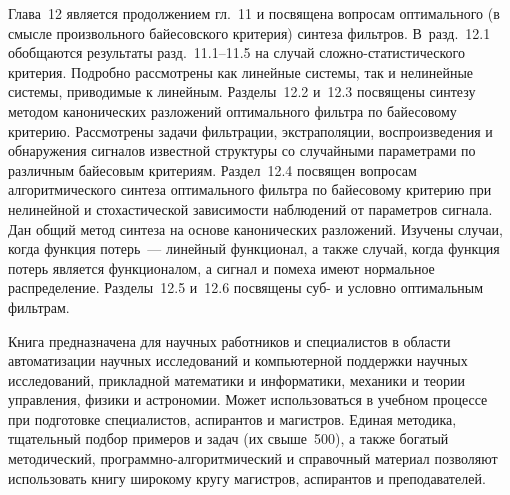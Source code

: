 \begin{multicols}{2}
{{\def\leftkol{РЕЦЕНЗИИ}

\def\rightkol{РЕЦЕНЗИИ} 

      Глава~12 является продолжением гл.~11 и посвящена вопросам оптимального (в 
смысле произвольного байесовского критерия) синтеза фильтров. В~разд.~12.1 
обобщаются результаты разд.~11.1--11.5 на случай сложно-ста\-ти\-сти\-че\-ско\-го критерия. 
Подробно рас\-смот\-ре\-ны как линейные системы, так и нелинейные системы, приводимые к 
линейным. Разделы~12.2 и~12.3 посвящены синтезу методом канонических разложений 
оптимального фильтра по байесовому критерию. Рассмотрены задачи фильтрации, 
экстраполяции, воспроизведения и обнаружения сигналов известной структуры со 
случайными параметрами по различным байесовым критериям. Раздел~12.4 посвящен 
вопросам алгоритмического синтеза оптимального фильтра по байесовому критерию при 
нелинейной и стохастической зависимости наблюдений от параметров сигнала. Дан 
общий метод синтеза на основе канонических разложений. Изучены случаи, когда 
функция потерь~--- линейный функционал, а также случай, когда функция потерь 
является функционалом, а сигнал и помеха имеют нормальное распределение. 
Разделы~12.5 и~12.6 посвящены суб- и условно оптимальным фильтрам.  
      
      
      \def\leftkol{РЕЦЕНЗИИ}

\def\rightkol{РЕЦЕНЗИИ} 
      
      Книга предназначена для научных работников и специалистов в области 
автоматизации научных исследований и компьютерной поддержки научных 
исследований, прикладной математики и информатики, механики и теории управления, 
физики и астрономии. Может использоваться в учебном процессе при подготовке 
специалистов, аспирантов и магистров. Единая методика, тщательный подбор примеров и 
задач (их свыше~500), а также богатый методический, программно-алгоритмический и 
справочный материал позволяют использовать книгу широкому кругу магистров, 
аспирантов и преподавателей.
      
}

}
\end{multicols}

